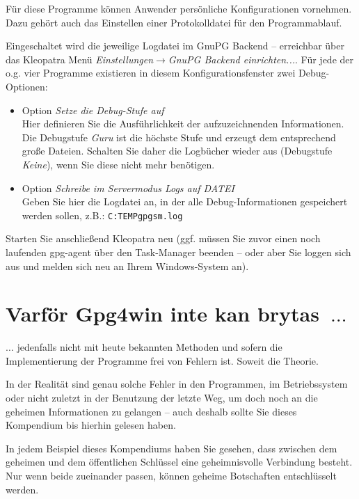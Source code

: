 \documentclass[a4paper,11pt, oneside,openright,titlepage,dvips]{scrbook}
\newcommand{\Menu}[1]{\emph{#1}}
\newcommand{\Filename}[1]{\texttt{#1}}
\newcounter{chapter}
\begin{document}
Für diese Programme können Anwender persönliche Konfigurationen vornehmen.
Dazu gehört auch das Einstellen einer Protokolldatei für den Programmablauf.

Eingeschaltet wird die jeweilige Logdatei im GnuPG Backend --
erreichbar über das Kleopatra Menü
\Menu{Einstellungen$\rightarrow$GnuPG Backend einrichten...}.
Für jede der o.g. vier Programme existieren in diesem
Konfigurationsfenster zwei Debug-Optionen:
\begin{itemize}
    \item Option \textit{Setze die Debug-Stufe auf}\\
        Hier definieren Sie die Ausführlichkeit der aufzuzeichnenden
        Informationen. Die Debugstufe \textit{Guru} ist die höchste Stufe und
        erzeugt dem entsprechend große Dateien.
        Schalten Sie daher die Logbücher wieder aus (Debugstufe
        \textit{Keine}), wenn Sie diese nicht mehr benötigen.

    \item Option \textit{Schreibe im Servermodus Logs auf DATEI}\\
        Geben Sie hier die Logdatei an, in der alle Debug-Informationen
        gespeichert werden sollen, z.B.:
        \Filename{C:\back{}TEMP\back{}gpgsm.log}
\end{itemize}

Starten Sie anschließend Kleopatra neu (ggf. müssen Sie zuvor einen
noch laufenden gpg-agent über den Task-Manager beenden -- oder aber Sie
loggen sich aus und melden sich neu an Ihrem Windows-System an).

\clearpage
\chapter{Varför Gpg4win inte kan brytas~$\ldots$}
\label{ch:themath}

$\ldots$ jedenfalls nicht mit heute bekannten Methoden und sofern die
Implementierung der Programme frei von Fehlern ist. Soweit die
Theorie.

In der Realität sind genau solche Fehler in den Programmen, im
Betriebssystem oder nicht zuletzt in der Benutzung der letzte
Weg, um doch noch an die geheimen Informationen zu gelangen --
auch deshalb sollte Sie dieses Kompendium bis hierhin gelesen haben.

In jedem Beispiel dieses Kompendiums haben Sie gesehen, dass zwischen dem
geheimen und dem öffentlichen Schlüssel eine geheimnisvolle
Verbindung besteht. Nur wenn beide zueinander passen, können
geheime Botschaften entschlüsselt werden.
\end{document}
